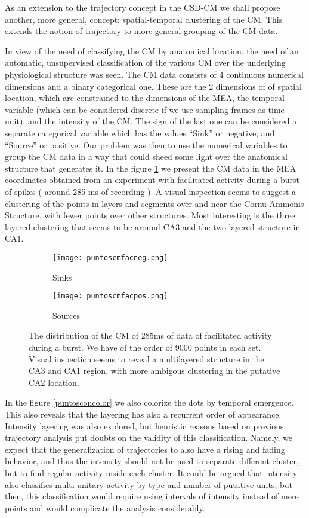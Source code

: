 \documentclass{article}
\begin{document}
As an extension to the trajectory concept in the CSD-CM we
shall propose another,  more general, concept: spatial-temporal
clustering of the CM.
This extends the notion of trajectory to more general grouping of the
CM data.

In view of the need of classifying the CM by anatomical location,
the need of an automatic, unsupervised classification of the various CM
over the underlying physiological structure was seen.  The CM data
consists of 4 continuous numerical dimensions and a binary categorical
one. These are the 2 dimensions of of spatial location, which are constrained
to the dimensions of the MEA, the temporal variable (which can be
considered discrete if we use sampling frames as time unit), and the intensity of the CM.
The sign of the last one can be considered a separate categorical variable which
has the values ``Sink'' or negative, and ``Source'' or positive. 
Our problem was then to use the numerical variables to group the CM data in
a way that could sheed some light over the anatomical structure that
generates it. In the figure \ref{puntostodos} we present the CM data
in the MEA coordinates obtained from an experiment with facilitated activity
during a burst of spikes ( around 285 ms of recording ). A visual inspection
seems to suggest a clustering of the points in layers and segments over and near the
Cornu Ammonis Structure, with fewer points over other structures. Most interesting
is the three layered clustering that seems to be around CA3 and the two layered
structure in CA1. 

\begin{figure}
\centering
\begin{subfigure}{0.40\textwidth}
\texttt{[image: puntoscmfacneg.png]}
\caption{Sinks}
\end{subfigure}
\begin{subfigure}{0.40\textwidth}
\texttt{[image: puntoscmfacpos.png]}
\caption{Sources}
\end{subfigure}

\caption{The distribution of the CM of 285ms of data of facilitated activity
during a burst. We have of the order of 9000 points in each
set. Visual inspection seems to reveal a multilayered structure in the
CA3 and CA1 region, with more ambigous clustering in the putative
CA2 location.}\label{puntostodos}

\end{figure}

In the figure \ref{puntosconcolor} we also colorize the dots by temporal emergence.
This also reveals that the layering has also a recurrent order of appearance. Intensity
layering was also explored, but heuristic reasons based on previous trajectory
analysis put doubts on the validity of this classification. Namely, we expect
that the generalization of trajectories to also have a rising and fading behavior,
and thus the intensity should not be used to separate different cluster, but to
find regular activity inside each cluster. It could be argued that intensity also
classifies multi-unitary activity by type and number of putative units, but then,
this classification would require using intervals of intensity instead of mere
points and would complicate the analysis considerably.
\end{document}
